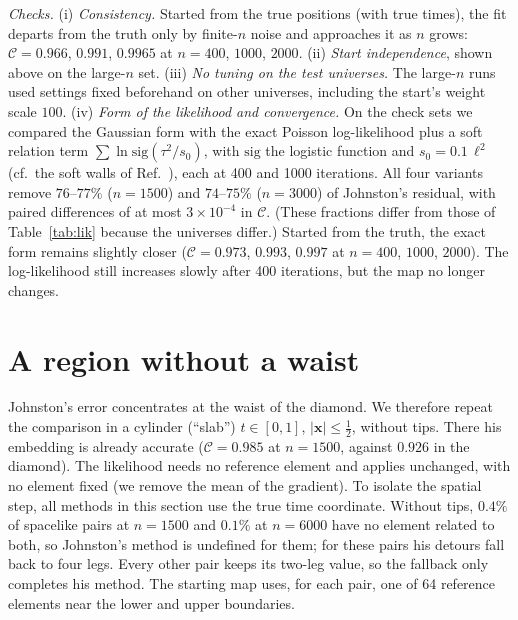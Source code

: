 \documentclass[prd,twocolumn,superscriptaddress,nofootinbib,amsmath,amssymb,floatfix]{revtex4-2}
\begin{document}
\emph{Checks.} (i) \emph{Consistency.} Started from the true positions (with true times), the fit departs from the truth only by finite-$n$ noise and approaches it as $n$ grows: $\mathcal C=0.966$, $0.991$, $0.9965$ at $n=400$, $1000$, $2000$. (ii) \emph{Start independence}, shown above on the large-$n$ set. (iii) \emph{No tuning on the test universes.} The large-$n$ runs used settings fixed beforehand on other universes, including the start's weight scale $100$. (iv) \emph{Form of the likelihood and convergence.} On the check sets we compared the Gaussian form with the exact Poisson log-likelihood plus a soft relation term $\sum\ln\mathrm{sig}(\tau^2/s_0)$, with $\mathrm{sig}$ the logistic function and $s_0=0.1\,\ell^2$ (cf.\ the soft walls of Ref.~\cite{Casasola26}), each at 400 and 1000 iterations. All four variants remove $76$--$77\%$ ($n=1500$) and $74$--$75\%$ ($n=3000$) of Johnston's residual, with paired differences of at most $3\times10^{-4}$ in $\mathcal C$. (These fractions differ from those of Table~\ref{tab:lik} because the universes differ.) Started from the truth, the exact form remains slightly closer ($\mathcal C=0.973$, $0.993$, $0.997$ at $n=400$, $1000$, $2000$). The log-likelihood still increases slowly after 400 iterations, but the map no longer changes.

\section{A region without a waist}\label{sec:slab}
Johnston's error concentrates at the waist of the diamond. We therefore repeat the comparison in a cylinder (``slab'') $t\in[0,1]$, $|\mathbf x|\le\tfrac12$, without tips. There his embedding is already accurate ($\mathcal C=0.985$ at $n=1500$, against $0.926$ in the diamond). The likelihood needs no reference element and applies unchanged, with no element fixed (we remove the mean of the gradient). To isolate the spatial step, all methods in this section use the true time coordinate. Without tips, $0.4\%$ of spacelike pairs at $n=1500$ and $0.1\%$ at $n=6000$ have no element related to both, so Johnston's method is undefined for them; for these pairs his detours fall back to four legs. Every other pair keeps its two-leg value, so the fallback only completes his method. The starting map uses, for each pair, one of 64 reference elements near the lower and upper boundaries.
\end{document}
